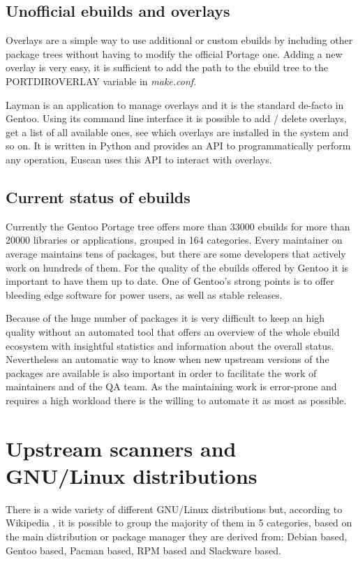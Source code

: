 \subsection{Unofficial ebuilds and overlays}
Overlays are a simple way to use additional or custom ebuilds by including other package trees without having to modify the official Portage one. Adding a new overlay is very easy, it is sufficient to add the path to the ebuild tree to the PORTDIR\textunderscore OVERLAY variable in \emph{make.conf}.

Layman is an application to manage overlays and it is the standard de-facto in Gentoo. Using its command line interface it is possible to add / delete overlays, get a list of all available ones, see which overlays are installed in the system and so on. It is written in Python and provides an API to programmatically perform any operation, Euscan uses this API to interact with overlays.


\subsection{Current status of ebuilds}
Currently the Gentoo Portage tree offers more than 33000 ebuilds for more than 20000 libraries or applications, grouped in 164 categories.
Every maintainer on average maintains tens of packages, but there are some developers that actively work on hundreds of them. For the quality of the ebuilds offered by Gentoo it is important to have them up to date. One of Gentoo's strong points is to offer bleeding edge software for power users, as well as stable releases.

Because of the huge number of packages it is very difficult to keep an high quality without an automated tool that offers an overview of the whole ebuild ecosystem with insightful statistics and information about the overall status. Nevertheless an automatic way to know when new upstream versions of the packages are available is also important in order to facilitate the work of maintainers and of the QA team.
As the maintaining work is error-prone and requires a high workload there is the willing to automate it as most as possible.


\section{Upstream scanners and GNU/Linux distributions}
There is a wide variety of different GNU/Linux distributions but, according to Wikipedia \cite{wikipedia_distros}, it is possible to group the majority of them in 5 categories, based on the main distribution or package manager they are derived from: Debian based, Gentoo based, Pacman based, RPM based and Slackware based.

